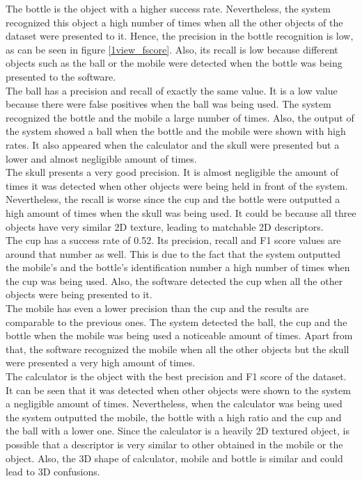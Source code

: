	The bottle is the object with a higher success rate. 
	Nevertheless, the system recognized this object a high number of times when all the other objects of the dataset were presented to it. 
	Hence, the precision in the bottle recognition is low, as can be seen in figure \ref{1view_fscore}.
	Also, its recall is low because different objects such as the ball or the mobile were detected when the bottle was being presented to the software.  
	\\

	The ball has a precision and recall of exactly the same value. 
	It is a low value because there were false positives when the ball was being used. 
	The system recognized the bottle and the mobile a large number of times. 
	Also, the output of the system showed a ball when the bottle and the mobile were shown with high rates. 
	It also appeared when the calculator and the skull were presented but a lower and almost negligible amount of times. 
	\\

	The skull presents a very good precision. 
	It is almost negligible the amount of times it was detected when other objects were being held in front of the system. 
	Nevertheless, the recall is worse since the cup and the bottle were outputted a high amount of times when the skull was being used. 
	It could be because all three objects have very similar 2D texture, leading to matchable 2D descriptors. 
	\\

	The cup has a success rate of 0.52. Its precision, recall and F1 score values are around that number as well. 
	This is due to the fact that the system outputted the mobile's and the bottle's identification number a high number of times when the cup was being used. 
	Also, the software detected the cup when all the other objects were being presented to it. 
	\\

	The mobile has even a lower precision than the cup and the results are comparable to the previous ones. 
	The system detected the ball, the cup and the bottle when the mobile was being used a noticeable amount of times.
	Apart from that, the software recognized the mobile when all the other objects but the skull were presented a very high amount of times. 
	\\

	The calculator is the object with the best precision and F1 score of the dataset. 
	It can be seen that it was detected when other objects were shown to the system a negligible amount of times. 
	Nevertheless, when the calculator was being used the system outputted the mobile, the bottle with a high ratio and the cup and the ball with a lower one.
	Since the calculator is a heavily 2D textured object, is possible that a descriptor is very similar to other obtained in the mobile or the object. 
	Also, the 3D shape of calculator, mobile and bottle is similar and could lead to 3D confusions.  


